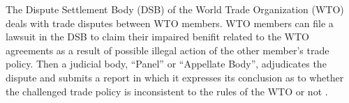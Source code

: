 The Dispute Settlement Body (DSB) of 
the World Trade Organization (WTO) deals 
with trade disputes between WTO members.
WTO members can file a lawsuit in the DSB to 
claim their impaired benifit related to the WTO agreements as a result of possible illegal action of the other member's trade policy.
Then a judicial body, ``Panel'' or ``Appellate Body'', 
adjudicates the dispute and submits a report in which it expresses
its conclusion as to whether the challenged 
trade policy is inconsistent to the rules of the WTO or not \citep{world2017handbook}.

 

